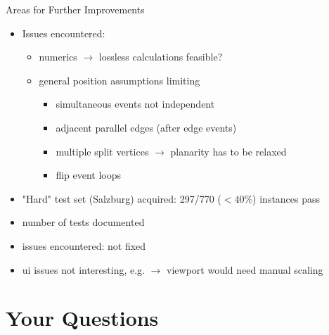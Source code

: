 \documentclass[
  size=9pt,
  style=jefka,
  paper=screen,
  mode=print,
  display=slides,
  nohandoutpagebreaks,
  pauseslide,
  hlsections,
  fleqn,
  dvips,
  clock
]{powerdot}
\begin{document}
\begin{slide}{Areas for Further Improvements}
  \begin{itemize}
    \item Issues encountered:
    \begin{itemize}
      \item numerics $\rightarrow$ lossless calculations feasible?
      \item general position assumptions limiting
      \begin{itemize}
        \item simultaneous events not independent
        \item adjacent parallel edges (after edge events)
        \item multiple split vertices $\rightarrow$ planarity has to be relaxed
        \item flip event loops
      \end{itemize}
    \end{itemize}

    \item "Hard" test set (Salzburg) acquired: 297/770 ($<40\%$) instances pass
  \end{itemize}
\end{slide}
\begin{note}{}
  \begin{itemize}
    \item number of tests documented
    \item issues encountered: not fixed
    \item ui issues not interesting, e.g. $\rightarrow$ viewport would need manual scaling
  \end{itemize}
\end{note}

\section[template=wideslide]{Your Questions}
\end{document}
